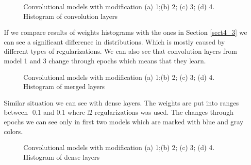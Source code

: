  
\begin{figure}[ht]
	\begin{minipage}[ht]{1\linewidth}
	\end{minipage}
	\hfill
	\begin{minipage}[ht]{1\linewidth}
	\end{minipage}
	\caption{Convolutional models with modification (a) 1;(b) 2; (c) 3; (d) 4. Histogram of convolution layers}
	\label{img:category_crossentropy}  
\end{figure}

\clearpage
If we compare results of weights histograms with the ones in Section \ref{sect4_3} we can see a significant difference in distributions.
Which is mostly caused by different types of regularizations. We can also see that convolution layers from model 1 and 3 change through epochs which
means that they learn.  

\begin{figure}[ht]
	\begin{minipage}[ht]{1\linewidth}
	\end{minipage}
	\hfill
	\begin{minipage}[ht]{1\linewidth}
	\end{minipage}
	\caption{Convolutional models with modification (a) 1;(b) 2; (c) 3; (d) 4. Histogram of merged layers}
	\label{img:category_crossentropy}  
\end{figure}

\clearpage
Similar situation we can see with dense layers. The weights are put into ranges between -0.1 and 0.1 where l2-regularizations was used.
The changes through epochs we can see only in first two models which are marked with blue and gray colors.   

\begin{figure}[ht]
	\begin{minipage}[ht]{1\linewidth}
	\end{minipage}
	\hfill
	\begin{minipage}[ht]{1\linewidth}
	\end{minipage}
	\caption{Convolutional models with modification (a) 1;(b) 2; (c) 3; (d) 4.  Histogram of dense layers}
	\label{img:category_crossentropy}  
\end{figure}


